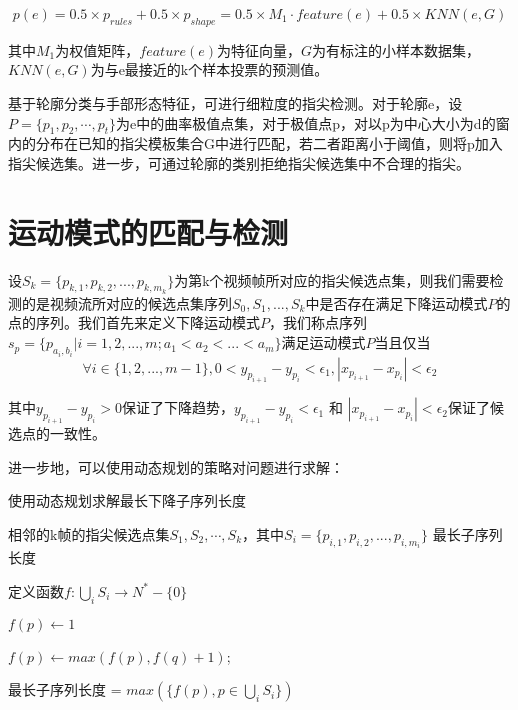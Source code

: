 \begin{equation}
    p(e) = 0.5\times p_{rules} + 0.5 \times p_{shape}=0.5 \times M_1 \cdot feature(e) + 0.5 \times KNN(e, G)
\end{equation}

其中$M_1$为权值矩阵，$feature(e)$为特征向量，$G$为有标注的小样本数据集，$KNN(e, G)$为与e最接近的k个样本投票的预测值。

基于轮廓分类与手部形态特征，可进行细粒度的指尖检测。对于轮廓e，设$P=\{p_1, p_2, \cdots, p_t\}$为e中的曲率极值点集，对于极值点p，对以p为中心大小为d的窗内的分布在已知的指尖模板集合G中进行匹配，若二者距离小于阈值，则将p加入指尖候选集。进一步，可通过轮廓的类别拒绝指尖候选集中不合理的指尖。



\section{运动模式的匹配与检测}
\label{cha:motion}
设$S_k = \{p_{k,1}, p_{k,2}, ... , p_{k,m_k}\}$为第k个视频帧所对应的指尖候选点集，则我们需要检测的是视频流所对应的候选点集序列$S_0, S_1, ... , S_k$中是否存在满足下降运动模式$P$的点的序列。我们首先来定义下降运动模式$P$，我们称点序列$s_p=\{p_{a_i,b_i}|i=1,2,...,m; a_1 < a_2 < ... < a_m\}$满足运动模式$P$当且仅当$$\forall i \in \{1,2,...,m-1\}, 0 < y_{p_{i+1}} - y_{p_i} < \epsilon_1, |x_{p_{i+1}} - x_{p_i}| < \epsilon_2$$

其中$y_{p_{i+1}} - y_{p_i} > 0$保证了下降趋势，$y_{p_{i+1}} - y_{p_i} < \epsilon_1$ 和 $|x_{p_{i+1}} - x_{p_i}| < \epsilon_2$保证了候选点的一致性。

进一步地，可以使用动态规划的策略对问题进行求解：

\begin{algorithm}
\caption{使用动态规划求解最长下降子序列长度}
\begin{algorithmic}
\Require 相邻的k帧的指尖候选点集$S_1, S_2, \cdots, S_k$，其中$S_i = \{p_{i,1}, p_{i,2}, ... , p_{i,m_i}\}$
\Ensure 最长子序列长度

定义函数$f: \bigcup_i S_i \rightarrow N^*-\{0\} $

    
        \State $f(p) \leftarrow 1$
        
        
            
                \State $f(p) \leftarrow max(f(p), f(q)+1)$;
                
            \EndIf
        
        \EndFor
        
    \EndFor
    
\EndFor

最长子序列长度 = $max(\{f(p), p \in \bigcup_i S_i\})$

\end{algorithmic}
\end{algorithm}

